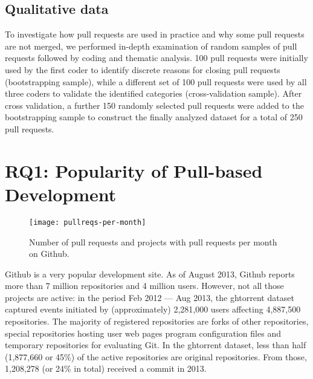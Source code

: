 \documentclass{sig-alternate}
\begin{document}
\subsection{Qualitative data}
\label{sec:qualdata}
To investigate how pull requests are used in practice and why some pull requests
are not merged, we performed in-depth examination of random samples of pull
requests followed by coding and thematic analysis. 100 pull requests were initially
used by the first coder to identify discrete reasons for closing pull requests
(bootstrapping sample), while a different set of 100 pull requests were used by
all three coders to validate the identified categories (cross-validation
sample). After cross validation, a further 150 randomly selected pull requests
were added to the bootstrapping sample to construct the finally analyzed
dataset for a total of 250 pull requests.


\section{RQ1: Popularity of Pull-based Development}
\label{sec:github}
%

\begin{figure}[t]
  \centering
\texttt{[image: pullreqs-per-month]}
\label{fig:pullreq-per-month}
\caption{Number of pull requests and projects with pull requests per month on
Github.}
\end{figure}

Github is a very popular development site. As of August 2013, Github reports
more than 7 million repositories and 4 million users. However, not all those
projects are active: in the period Feb 2012 --- Aug 2013, the {\sc ght}orrent dataset captured events initiated by
(approximately) 2,281,000 users affecting 4,887,500 repositories. The majority
of registered repositories are forks of other repositories, special repositories
hosting user web pages 
program
configuration files 
and temporary repositories for evaluating Git. 
In the {\sc ght}orrent dataset, less than half
(1,877,660 or 45\%) of the active repositories are original repositories. From
those, 1,208,278 (or 24\% in total) received a commit in 2013.
\end{document}

